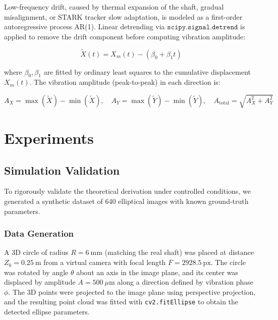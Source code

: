 \documentclass[journal]{IEEEtran}
\begin{document}
Low-frequency drift, caused by thermal expansion of the shaft, gradual
misalignment, or STARK tracker slow adaptation, is modeled as a first-order
autoregressive process AR(1). Linear detrending via
$\texttt{scipy.signal.detrend}$ is applied to remove the drift component
before computing vibration amplitude:

\begin{equation}
\tilde{X}(t) = X_m(t) - (\beta_0 + \beta_1 t)
\label{eq:detrend}
\end{equation}

where $\beta_0, \beta_1$ are fitted by ordinary least squares to the
cumulative displacement $X_m(t)$. The vibration amplitude (peak-to-peak)
in each direction is:

\begin{equation}
A_X = \max(\tilde{X}) - \min(\tilde{X}), \quad
A_Y = \max(\tilde{Y}) - \min(\tilde{Y}), \quad
A_{\text{total}} = \sqrt{A_X^{2} + A_Y^{2}}
\label{eq:amplitude}
\end{equation}

\section{Experiments}

\subsection{Simulation Validation}
\label{sec:sim}

To rigorously validate the theoretical derivation under controlled conditions,
we generated a synthetic dataset of 640 elliptical images with known ground-truth
parameters.

\subsubsection{Data Generation}

A 3D circle of radius $R = 6~\text{mm}$ (matching the real shaft) was placed at
distance $Z_0 = 0.25~\text{m}$ from a virtual camera with focal length
$F = 2928.5~\text{px}$. The circle was rotated by angle $\theta$ about an axis
in the image plane, and its center was displaced by amplitude $A = 500~\mu\text{m}$
along a direction defined by vibration phase $\phi$. The 3D points were projected
to the image plane using perspective projection, and the resulting point cloud
was fitted with \texttt{cv2.fitEllipse} to obtain the detected ellipse parameters.
\end{document}
